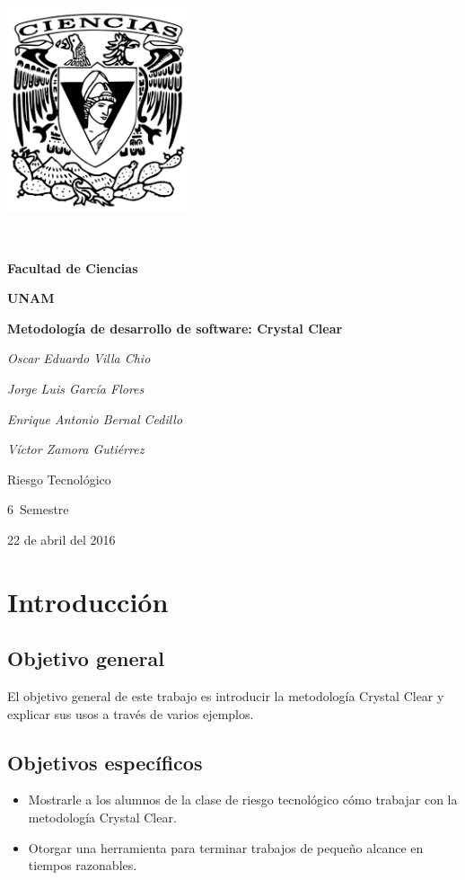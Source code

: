 \documentclass[12pt,a4paper]{article}
\begin{document}
	
	\begin{titlepage}
		\centering
		\includegraphics[width=0.4\textwidth]{./images/logo_ciencias}\par\
		{\LARGE\bf Facultad de Ciencias \par}
		{\LARGE\bf UNAM \par}
		\vspace{1cm}
		{\huge\bfseries Metodolog\'ia de desarrollo de software: Crystal Clear\par}
		\vspace{2cm}
		{\Large\itshape Oscar Eduardo Villa Chio\par}
		{\Large\itshape Jorge Luis Garc\'ia Flores\par}
		{\Large\itshape Enrique Antonio Bernal Cedillo\par}
		{\Large\itshape V\'ictor Zamora Guti\'errez\par}
		\vspace{0.5cm}
		{\large Riesgo Tecnol\'ogico\par 6\textdegree \ Semestre\par}
		{\large 22 de abril del 2016}
	\end{titlepage}
	
	\section{Introducci\'on}
	
	\subsection{Objetivo general}
	El objetivo general de este trabajo es introducir la metodolog\'ia Crystal Clear y explicar sus usos a trav\'es de varios ejemplos.
	
	\subsection{Objetivos espec\'ificos}
	\begin{itemize}
		\item Mostrarle a los alumnos de la clase de riesgo tecnol\'ogico c\'omo trabajar con la metodolog\'ia Crystal Clear.
		
		\item Otorgar una herramienta para terminar trabajos de peque\~no alcance en tiempos razonables.
	\end{itemize}
	
\end{document}
